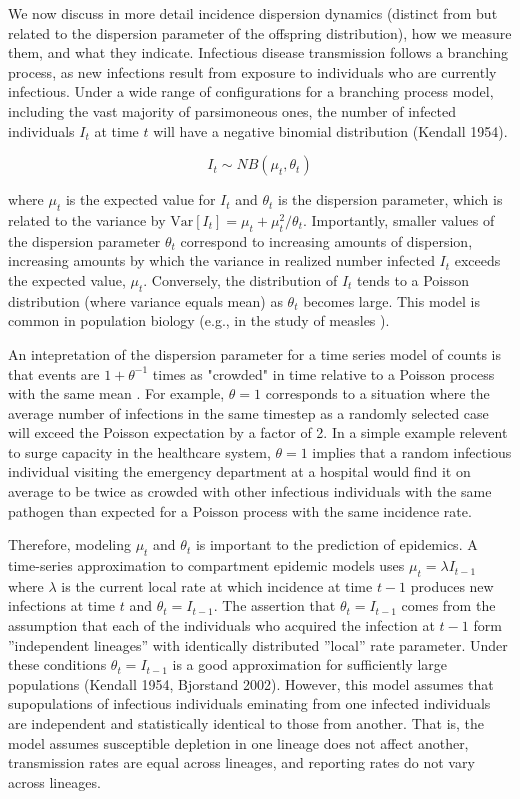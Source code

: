 \documentclass[10pt,letterpaper]{article}
\begin{document}
We now discuss in more detail incidence dispersion dynamics (distinct from but related to the dispersion parameter of the offspring distribution), how we measure them, and what they indicate.
Infectious disease transmission follows a branching process, as new infections result from exposure to individuals who are currently infectious. Under a wide range of configurations for a branching process model, including the vast majority of parsimoneous ones, the number of infected individuals $I_t$ at time $t$ will have a negative binomial distribution (Kendall 1954).

$$
I_t \sim NB \left( \mu_t, \theta_t \right)
$$

where $\mu_t$ is the expected value for $I_t$ and $\theta_t$ is the dispersion parameter, which is related to the variance by $\mathrm{Var}[I_t] = \mu_t + \mu_t^2 / \theta_t$. Importantly, smaller values of the dispersion parameter $\theta_t$ correspond to increasing amounts of dispersion, increasing amounts by which the variance in realized number infected $I_t$ exceeds the expected value, $\mu_t$. Conversely, the distribution of $I_t$ tends to a Poisson distribution (where variance equals mean) as $\theta_t$ becomes large. This model is common in population biology (e.g., in the study of measles \cite{grenfell_dynamics_2002}).

An intepretation of the dispersion parameter for a time series model of counts is that events are $1 + \theta^{-1}$ times as "crowded" in time relative to a Poisson process with the same mean \cite{lloyd_mean_1967}. For example, $\theta = 1$ corresponds to a situation where the average number of infections in the same timestep as a randomly selected case will exceed the Poisson expectation by a factor of 2. In a simple example relevent to surge capacity in the healthcare system, $\theta = 1$ implies that a random infectious individual visiting the emergency department at a hospital would find it on average to be twice as crowded with other infectious individuals with the same pathogen than expected for a Poisson process with the same incidence rate.

Therefore, modeling $\mu_t$ and $\theta_t$ is important to the prediction of epidemics. A time-series approximation to compartment epidemic models uses $\mu_t = \lambda I_{t-1}$ where $\lambda$ is the current local rate at which incidence at time $t-1$ produces new infections at time $t$ and $\theta_t = I_{t-1}$. The assertion that $\theta_t = I_{t-1}$ comes from the assumption that each of the individuals who acquired the infection at $t-1$ form ''independent lineages'' with identically distributed ''local'' rate parameter. Under these conditions $\theta_t = I_{t-1}$ is a good approximation for sufficiently large populations (Kendall 1954, Bjorstand 2002). However, this model assumes that supopulations of infectious individuals eminating from one infected individuals are independent and statistically identical to those from another. That is, the model assumes susceptible depletion in one lineage does not affect another, transmission rates are equal across lineages, and reporting rates do not vary across lineages. 
\end{document}
